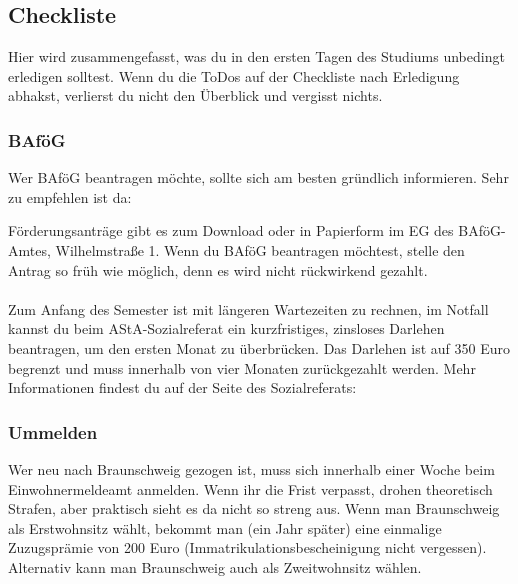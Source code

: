 
\subsection{Checkliste}
\label{checkliste}
	Hier wird zusammengefasst, was du in den ersten Tagen des Studiums unbedingt erledigen solltest. Wenn du die ToDos auf der Checkliste nach Erledigung abhakst, verlierst du nicht den Überblick und vergisst nichts.
	
\vspace*{0.5cm}


\begin{multicols}{2}

\subsubsection{BAföG}
	\label{todobafoeg}

	Wer BAföG beantragen möchte, sollte sich am besten gründlich informieren. Sehr zu empfehlen ist da: \\
 
	Förderungsanträge gibt es zum Download oder in Papierform im EG des BAföG-Amtes, Wilhelmstraße 1. Wenn du BAföG beantragen möchtest, stelle den Antrag so früh wie möglich, denn es wird nicht rückwirkend gezahlt.\\\\
	Zum Anfang des Semester ist mit längeren Wartezeiten zu rechnen, im Notfall kannst du beim AStA-Sozialreferat ein kurzfristiges, zinsloses Darlehen beantragen, um den ersten Monat zu überbrücken. Das Darlehen ist auf 350 Euro begrenzt und muss innerhalb von vier Monaten zurückgezahlt werden. Mehr Informationen findest du auf der Seite des Sozialreferats: 


\subsubsection{Ummelden}
	\label{todoummelden}

	Wer neu nach Braunschweig gezogen ist, muss sich innerhalb einer Woche beim Einwohnermeldeamt anmelden. Wenn ihr die Frist verpasst, drohen theoretisch Strafen, aber praktisch sieht es da nicht so streng aus. Wenn man Braunschweig als Erstwohnsitz wählt, bekommt man (ein Jahr später) eine einmalige Zuzugsprämie von 200 Euro (Immatrikulationsbescheinigung nicht vergessen). Alternativ kann man Braunschweig auch als Zweitwohnsitz wählen.


\end{multicols}
